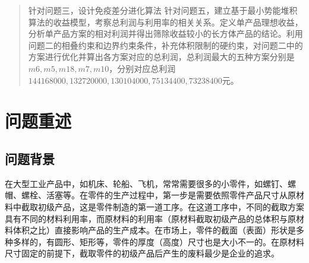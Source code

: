 \documentclass{whutmod}
\begin{document}
\begin{abstract}
		\vspace{7pt}	%
		针对问题三，设计免疫差分进化算法
		\vspace{7pt}	%
		针对问题五，建立基于最小势能堆积算法的收益模型，考察总利润与利用率的相关关系。定义单产品理想收益，分析单产品方案的相对利润并得出筛除收益较小的长方体产品的结论。利用问题二的相叠约束和边界约束条件，补充体积限制的硬约束，对问题二中的方案进行优化并算出各方案对应的总利润，总利润最大的五种方案分别是$m6,m5,m18,m7,m10$，分别对应总利润$144168000,132720000,130104000,75134400,73238400$元。
		
	\end{abstract}


	\thispagestyle{empty}
	\tableofcontents
	\setcounter{page}{0}  
		\thispagestyle{empty}                                             
	\newpage	%
	

	
	\section{问题重述}	
		\subsection{问题背景}
	    	在大型工业产品中，如机床、轮船、飞机，常常需要很多的小零件，如螺钉、螺帽、螺栓、活塞等。在零件的生产过程中，第一步是需要依照零件产品尺寸从原材料中截取初级产品，这是零件制造的第一道工序。在这道工序中，不同的截取方案具有不同的材料利用率，而原材料的利用率（原材料截取初级产品的总体积与原材料体积之比）直接影响产品的生产成本。在市场上，零件的截面（表面）形状是多种多样的，有圆形、矩形等，零件的厚度（高度）尺寸也是大小不一的。在原材料尺寸固定的前提下，截取零件的初级产品后产生的废料最少是企业的追求。
	
\end{document}
